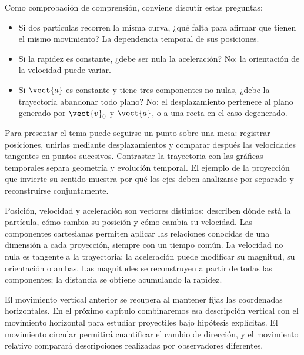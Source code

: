 Como comprobación de comprensión, conviene discutir estas preguntas:
\begin{itemize}
    \item Si dos partículas recorren la misma curva, ¿qué falta para
    afirmar que tienen el mismo movimiento? La dependencia temporal
    de sus posiciones.
    \item Si la rapidez es constante, ¿debe ser nula la aceleración?
    No: la orientación de la velocidad puede variar.
    \item Si \(\vect{a}\) es constante y tiene tres componentes no nulas,
    ¿debe la trayectoria abandonar todo plano? No: el desplazamiento
    pertenece al plano generado por \(\vect{v}_0\) y \(\vect{a}\),
    o a una recta en el caso degenerado.
\end{itemize}

\begin{notapedagogica}
Para presentar el tema puede seguirse un punto sobre una mesa: registrar
posiciones, unirlas mediante desplazamientos y comparar después las
velocidades tangentes en puntos sucesivos. Contrastar la trayectoria con
las gráficas temporales separa geometría y evolución temporal. El ejemplo
de la proyección que invierte su sentido muestra por qué los ejes deben
analizarse por separado y reconstruirse conjuntamente.
\end{notapedagogica}

\begin{resumen}
Posición, velocidad y aceleración son vectores distintos: describen dónde
está la partícula, cómo cambia su posición y cómo cambia su velocidad.
Las componentes cartesianas permiten aplicar las relaciones conocidas de
una dimensión a cada proyección, siempre con un tiempo común. La velocidad
no nula es tangente a la trayectoria; la aceleración puede modificar su
magnitud, su orientación o ambas. Las magnitudes se reconstruyen a partir
de todas las componentes; la distancia se obtiene acumulando la rapidez.
\end{resumen}

El movimiento vertical anterior se recupera al mantener fijas las
coordenadas horizontales. En el próximo capítulo combinaremos esa
descripción vertical con el movimiento horizontal para estudiar proyectiles
bajo hipótesis explícitas. El movimiento circular permitirá cuantificar
el cambio de dirección, y el movimiento relativo comparará descripciones
realizadas por observadores diferentes.
